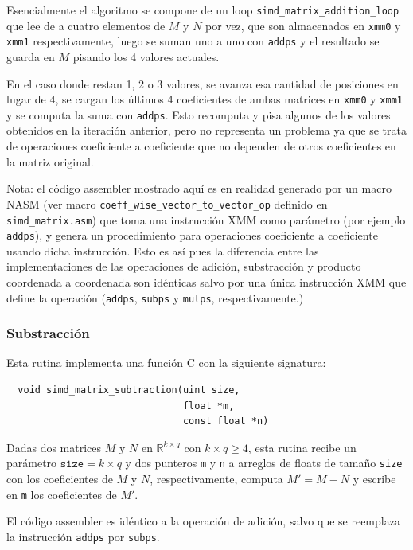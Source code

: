 \documentclass[a4paper, 10pt, twoside]{article}
\newcommand{\cc}[1]{\texttt{#1}}
\begin{document}
Esencialmente el algoritmo se compone de un loop
\cc{simd\_matrix\_addition\_loop} que lee de a cuatro elementos de $M$ y $N$
por vez, que son almacenados en \cc{xmm0} y \cc{xmm1} respectivamente, luego se
suman uno a uno con \cc{addps} y el resultado se guarda en $M$ pisando los 4
valores actuales.

En el caso donde restan 1, 2 o 3 valores, se avanza esa cantidad de posiciones
en lugar de 4, se cargan los últimos 4 coeficientes de ambas matrices en
\cc{xmm0} y \cc{xmm1} y se computa la suma con \cc{addps}. Esto recomputa y
pisa algunos de los valores obtenidos en la iteración anterior, pero no
representa un problema ya que se trata de operaciones coeficiente a coeficiente
que no dependen de otros coeficientes en la matriz original.

Nota: el código assembler mostrado aquí es en realidad generado por un macro
NASM (ver macro \cc{coeff\_wise\_vector\_to\_vector\_op} definido en
\cc{simd\_matrix.asm}) que toma una instrucción XMM como parámetro (por ejemplo
\cc{addps}), y genera un procedimiento para operaciones coeficiente a
coeficiente usando dicha instrucción. Esto es así pues la diferencia entre las
implementaciones de las operaciones de adición, substracción y producto
coordenada a coordenada son idénticas salvo por una única instrucción XMM que
define la operación (\cc{addps}, \cc{subps} y \cc{mulps}, respectivamente.)


\subsubsection{Substracción}

Esta rutina implementa una función C con la siguiente signatura:

\begin{verbatim}
  void simd_matrix_subtraction(uint size,
                               float *m,
                               const float *n)
\end{verbatim}

Dadas dos matrices $M$ y $N$ en $\mathbb{R}^{k \times q}$ con $k \times q \geq
4$, esta rutina recibe un parámetro $\cc{size} = k \times q$ y dos punteros
\cc{m} y \cc{n} a arreglos de floats de tamaño \cc{size} con los coeficientes
de $M$ y $N$, respectivamente, computa $M' = M - N$ y escribe en \cc{m} los
coeficientes de $M'$.

El código assembler es idéntico a la operación de adición, salvo que se
reemplaza la instrucción \cc{addps} por \cc{subps}.
\end{document}
